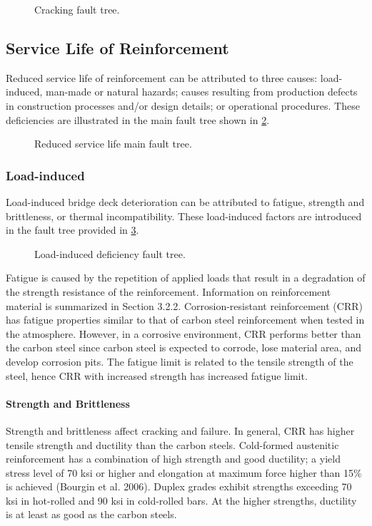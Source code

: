 \begin{figure}
  \caption{Cracking fault tree.}
  \label{fig:fault-tree-cracking} 
\end{figure}


\subsection{Service Life of Reinforcement}
Reduced service life of reinforcement can be attributed to three causes: load-induced, man-made or natural
hazards; causes resulting from production defects in construction processes and/or design details; or operational
procedures. These deficiencies are illustrated in the main fault tree shown in \cref{fig:fault-tree-reduced-main}.

\begin{figure}
  \caption{Reduced service life main fault tree.}
  \label{fig:fault-tree-reduced-main} 
\end{figure}

\subsubsection{Load-induced}
Load-induced bridge deck deterioration can be attributed to fatigue, strength and brittleness, or thermal
incompatibility. These load-induced factors are introduced in the fault tree provided in \cref{fig:fault-tree-load-induced}.

\begin{figure}
  \caption{Load-induced deficiency fault tree.}
  \label{fig:fault-tree-load-induced} 
\end{figure}

Fatigue is caused by the repetition of applied loads that result in a degradation of the strength resistance of the
reinforcement. Information on reinforcement material is summarized in Section 3.2.2. Corrosion-resistant
reinforcement (CRR) has fatigue properties similar to that of carbon steel reinforcement when tested in the
atmosphere. However, in a corrosive environment, CRR performs better than the carbon steel since carbon steel is expected to corrode, lose material area, and develop corrosion pits. The fatigue limit is related to the tensile strength
of the steel, hence CRR with increased strength has increased fatigue limit.

\paragraph{Strength and Brittleness}
Strength and brittleness affect cracking and failure. In general, CRR has higher tensile strength and ductility than
the carbon steels. Cold-formed austenitic reinforcement has a combination of high strength and good ductility; a yield
stress level of 70 ksi or higher and elongation at maximum force higher than 15\% is achieved (Bourgin et al. 2006).
Duplex grades exhibit strengths exceeding 70 ksi in hot-rolled and 90 ksi in cold-rolled bars. At the higher strengths,
ductility is at least as good as the carbon steels.

